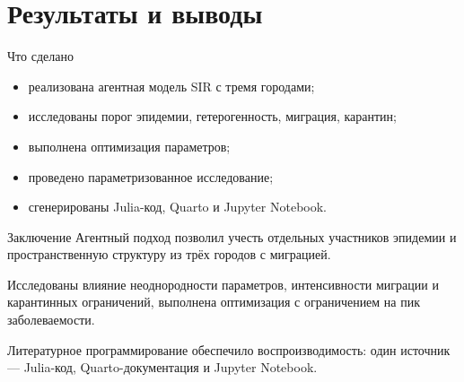 \documentclass[
  ignorenonframetext,
  aspectratio=169,
  russian,
]{beamer}
\providecommand{\tightlist}{%
  \setlength{\itemsep}{0pt}\setlength{\parskip}{0pt}}
\begin{document}
\section{Результаты и
выводы}\label{ux440ux435ux437ux443ux43bux44cux442ux430ux442ux44b-ux438-ux432ux44bux432ux43eux434ux44b}

\begin{frame}{Что сделано}
\protect{}\label{ux447ux442ux43e-ux441ux434ux435ux43bux430ux43dux43e}
\begin{itemize}[<+->]
\tightlist
\item
  реализована агентная модель SIR с тремя городами;
\item
  исследованы порог эпидемии, гетерогенность, миграция, карантин;
\item
  выполнена оптимизация параметров;
\item
  проведено параметризованное исследование;
\item
  сгенерированы Julia-код, Quarto и Jupyter Notebook.
\end{itemize}
\end{frame}

\begin{frame}{Заключение}
\protect{}\label{ux437ux430ux43aux43bux44eux447ux435ux43dux438ux435}
Агентный подход позволил учесть отдельных участников эпидемии и
пространственную структуру из трёх городов с миграцией.

Исследованы влияние неоднородности параметров, интенсивности миграции и
карантинных ограничений, выполнена оптимизация с ограничением на пик
заболеваемости.

Литературное программирование обеспечило воспроизводимость: один
источник --- Julia-код, Quarto-документация и Jupyter Notebook.
\end{frame}
\end{document}
